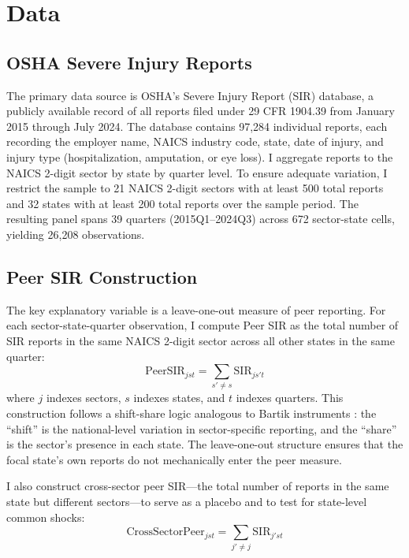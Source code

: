 \documentclass[12pt]{article}
\begin{document}
\section{Data}
\label{sec:data}

\subsection{OSHA Severe Injury Reports}

The primary data source is OSHA's Severe Injury Report (SIR) database, a publicly available record of all reports filed under 29 CFR 1904.39 from January 2015 through July 2024. The database contains 97,284 individual reports, each recording the employer name, NAICS industry code, state, date of injury, and injury type (hospitalization, amputation, or eye loss). I aggregate reports to the NAICS 2-digit sector by state by quarter level. To ensure adequate variation, I restrict the sample to 21 NAICS 2-digit sectors with at least 500 total reports and 32 states with at least 200 total reports over the sample period. The resulting panel spans 39 quarters (2015Q1--2024Q3) across 672 sector-state cells, yielding 26,208 observations.

\subsection{Peer SIR Construction}

The key explanatory variable is a leave-one-out measure of peer reporting. For each sector-state-quarter observation, I compute Peer SIR as the total number of SIR reports in the same NAICS 2-digit sector across all other states in the same quarter:
\begin{equation}
\text{PeerSIR}_{jst} = \sum_{s' \neq s} \text{SIR}_{js't}
\label{eq:peer}
\end{equation}
where $j$ indexes sectors, $s$ indexes states, and $t$ indexes quarters. This construction follows a shift-share logic analogous to Bartik instruments \citep{goldsmith2013bartik}: the ``shift'' is the national-level variation in sector-specific reporting, and the ``share'' is the sector's presence in each state. The leave-one-out structure ensures that the focal state's own reports do not mechanically enter the peer measure.

I also construct cross-sector peer SIR---the total number of reports in the same state but different sectors---to serve as a placebo and to test for state-level common shocks:
\begin{equation}
\text{CrossSectorPeer}_{jst} = \sum_{j' \neq j} \text{SIR}_{j'st}
\label{eq:cross}
\end{equation}
\end{document}
